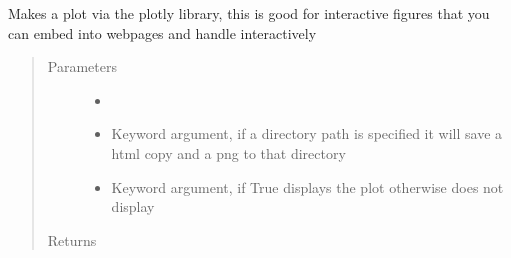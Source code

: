\documentclass[letterpaper,10pt,english]{sphinxmanual}
\begin{document}
\begin{fulllineitems}
\label{\detokenize{mpo:mpo.plot.plotly_plot}}
\sphinxAtStartPar
Makes a plot via the plotly library, this is good for interactive figures that you can embed into webpages and handle interactively
\begin{quote}\begin{description}
\item[{Parameters}] \leavevmode\begin{itemize}
\item {} 
\sphinxAtStartPar
{} \textendash{} 

\item {} 
\sphinxAtStartPar
{} \textendash{} Keyword argument, if a directory path is specified it will save a html copy and a png to that directory

\item {} 
\sphinxAtStartPar
{} \textendash{} Keyword argument, if True displays the plot otherwise does not display

\end{itemize}

\item[{Returns}] \leavevmode
\sphinxAtStartPar


\end{description}\end{quote}

\end{fulllineitems}

\end{document}

